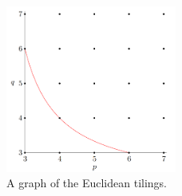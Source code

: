 \begin{figure}[h]
\centering
\includegraphics[width=0.5\textwidth]{Fig51}
\caption{A graph of the Euclidean tilings.} 
\end{figure}

